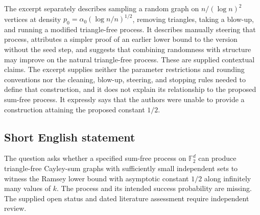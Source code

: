 \documentclass[11pt]{article}
\newcommand{\F}{\mathbb{F}}
\begin{document}
The excerpt separately describes sampling a random graph on \(n/(\log n)^2\) vertices at density \(p_0=\alpha_0(\log n/n)^{1/2}\), removing triangles, taking a blow-up, and running a modified triangle-free process. It describes manually steering that process, attributes a simpler proof of an earlier lower bound to the version without the seed step, and suggests that combining randomness with structure may improve on the natural triangle-free process. These are supplied contextual claims. The excerpt supplies neither the parameter restrictions and rounding conventions nor the cleaning, blow-up, steering, and stopping rules needed to define that construction, and it does not explain its relationship to the proposed sum-free process. It expressly says that the authors were unable to provide a construction attaining the proposed constant \(1/2\).
\subsection{Short English statement}
The question asks whether a specified sum-free process on \(\F_2^d\) can produce triangle-free Cayley-sum graphs with sufficiently small independent sets to witness the Ramsey lower bound with asymptotic constant \(1/2\) along infinitely many values of \(k\). The process and its intended success probability are missing. The supplied open status and dated literature assessment require independent review.
\end{document}
